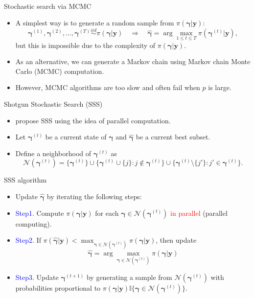 \documentclass[citecolor=blue,10pt]{beamer}
\def\bg{{\boldsymbol \gamma}}
\newcommand{\0} {\mbox{\boldmath$0$}}
\newcommand{\uy}{{\boldsymbol y}}
\begin{document}
\begin{frame}{Stochastic search via MCMC}
\begin{itemize}\itemsep=3mm
\item A simplest way is to generate a random sample from $\pi(\bg|\uy)$:\\
$$\bg^{(1)},\bg^{(2)},\ldots,\bg^{(T)} \overset{iid}{\sim} \pi(\bg|\uy) \quad \Rightarrow \quad  \hat{\bg}=\arg \max_{1\leq t\leq T}\pi(\bg^{(t)}|\uy),$$
 but this is impossible due to the complexity of $\pi(\bg|\uy)$.
\item As an alternative, we can generate a Markov chain using Markov chain Monte Carlo (MCMC) computation.
\item However, MCMC algorithms are too slow and often fail when $p$ is large.
\end{itemize}
\end{frame}


\begin{frame}{Shotgun Stochastic Search (SSS)}
\begin{itemize}\itemsep=3mm
\item \citet{hans2007shotgun} propose SSS using the idea of parallel computation.
\item Let $\bg^{(t)}$ be a current state of $\bg$ and $\hat{\bg}$ be a current best subset.
\item Define a neighborhood of $\bg^{(t)}$ as
$$\mathcal{N}(\bg^{(t)})=\{ \bg^{(t)} \}\cup \{\bg^{(t)} \cup \{j\}: j\notin \bg^{(t)}\}\cup \{\bg^{(t)} \setminus \{j'\}: j'\in \bg^{(t)}\}.$$
\end{itemize}
\end{frame}


\begin{frame}{SSS algorithm}
\begin{itemize}\itemsep=3mm
\item Update $\hat{\bg}$ by iterating the following steps:
\item[] \textcolor{blue}{Step1.} Compute $\pi(\bg|\uy)$ for each $\bg \in \mathcal{N}(\bg^{(t)})$ \textcolor{red}{in parallel} (parallel computing).
\item[] \textcolor{blue}{Step2.} If $\pi(\hat{\bg}|\uy)< \max_{\bg \in \mathcal{N}(\bg^{(t)}) }\pi(\bg|\uy)$, then update $$\hat{\bg}= \arg\max_{\bg \in \mathcal{N}(\bg^{(t)}) }\pi(\bg|\uy)$$
\item[] \textcolor{blue}{Step3.} Update $\bg^{(t+1)}$ by generating a sample from $ \mathcal{N}(\bg^{(t)})$ with probabilities proportional to $\pi(\bg|\uy)  \mathbb{I}\{\bg \in \mathcal{N}(\bg^{(t)})\}$.
\end{itemize}
\end{frame}
\end{document}
